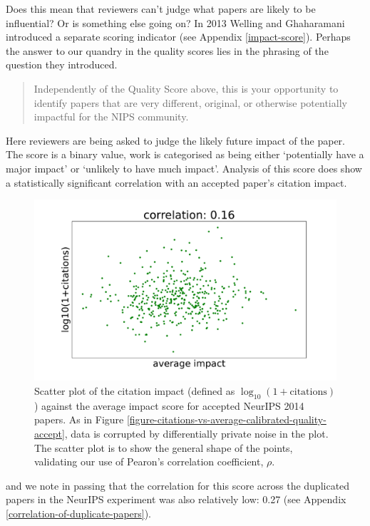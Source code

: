 \documentclass[twoside]{article}
\begin{document}
Does this mean that reviewers can't judge what papers are likely to be influential? Or is something else going on? In 2013 Welling and Ghaharamani introduced a separate scoring indicator (see Appendix \ref{impact-score}). Perhaps the answer to our quandry in the quality scores lies in the phrasing of the question they introduced.
\begin{quote}
  Independently of the Quality Score above, this is your opportunity to
identify papers that are very different, original, or otherwise
potentially impactful for the NIPS community.
\end{quote}

Here reviewers are being asked to judge the likely future impact of the paper. The score is a binary value, work is categorised as being either `potentially have a major impact' or `unlikely to have much impact'. Analysis of this score does show a statistically significant correlation with an accepted paper's citation impact.

\begin{figure}[htb]
  \begin{center}
    \includegraphics[width=0.9\columnwidth]{diagrams/neurips/citations-vs-average-impact-accept.pdf}
  \end{center}
  \caption{Scatter plot of the citation impact (defined as $\log_{10}(1+\text{citations})$) against the average impact score for accepted NeurIPS 2014 papers. As in Figure \ref{figure-citations-vs-average-calibrated-quality-accept}, data  is corrupted by differentially private noise in the plot. The scatter plot is to show the general shape of the points, validating our use of Pearon's correlation coefficient, $\rho$.}
  \label{figure-citations-vs-average-impact-accept}
\end{figure}

and we note in passing that the correlation for this score across the duplicated papers in the NeurIPS experiment was also relatively low: 0.27 (see Appendix \ref{correlation-of-duplicate-papers}).
\end{document}
